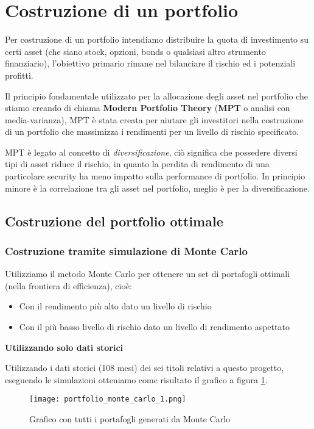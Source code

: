 \section{Costruzione di un portfolio}

Per costruzione di un portfolio intendiamo distribuire la quota di investimento su certi asset (che siano stock, opzioni, bonds o qualsiasi altro strumento finanziario), l'obiettivo primario rimane nel bilanciare il rischio ed i potenziali profitti.

Il principio fondamentale utilizzato per la allocazione degli asset nel portfolio che stiamo creando di chiama \textbf{Modern Portfolio Theory} (\textbf{MPT} o analisi con media-varianza), MPT è stata creata
per aiutare gli investitori nella costruzione di un portfolio che massimizza i rendimenti per un livello di rischio specificato.

MPT è legato al concetto di \emph{diversificazione}, ciò significa che possedere diversi tipi di asset riduce il rischio, in quanto la perdita di rendimento di una particolare security ha meno impatto
sulla performance di portfolio. In principio minore è la correlazione tra gli asset nel portfolio, meglio è per la diversificazione.

\subsection{Costruzione del portfolio ottimale}

\subsubsection{Costruzione tramite simulazione di Monte Carlo}

Utilizziamo il metodo Monte Carlo per ottenere un set di portafogli ottimali (nella frontiera di efficienza), cioè:
\begin{itemize}
    \item Con il rendimento più alto dato un livello di rischio
    \item Con il più basso livello di rischio dato un livello di rendimento aspettato
\end{itemize}

\textbf{Utilizzando solo dati storici}

Utilizzando i dati storici (108 mesi) dei sei titoli relativi a questo progetto, eseguendo le simulazioni otteniamo come risultato il grafico a figura \ref{fig:pf_monte_carlo_1}.

\begin{figure}[ht]
    \centering
    \texttt{[image: portfolio\_monte\_carlo\_1.png]}
    \caption{Grafico con tutti i portafogli generati da Monte Carlo}
    \label{fig:pf_monte_carlo_1}
\end{figure}

